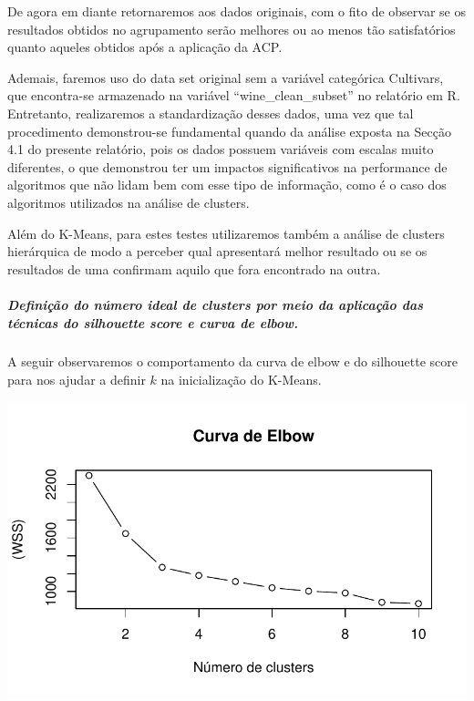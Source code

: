 \documentclass[
  letterpaper,
  DIV=11,
  numbers=noendperiod]{scrartcl}
\let\oldsubparagraph\subparagraph
\renewcommand{\subparagraph}[1]{\oldsubparagraph{#1}\mbox{}}
\begin{document}
De agora em diante retornaremos aos dados originais, com o fito de
observar se os resultados obtidos no agrupamento serão melhores ou ao
menos tão satisfatórios quanto aqueles obtidos após a aplicação da ACP.

Ademais, faremos uso do data set original sem a variável categórica
Cultivars, que encontra-se armazenado na variável
``wine\_clean\_subset'' no relatório em R. Entretanto, realizaremos a
standardização desses dados, uma vez que tal procedimento demonstrou-se
fundamental quando da análise exposta na Secção 4.1 do presente
relatório, pois os dados possuem variáveis com escalas muito diferentes,
o que demonstrou ter um impactos significativos na performance de
algoritmos que não lidam bem com esse tipo de informação, como é o caso
dos algoritmos utilizados na análise de clusters.

Além do K-Means, para estes testes utilizaremos também a análise de
clusters hierárquica de modo a perceber qual apresentará melhor
resultado ou se os resultados de uma confirmam aquilo que fora
encontrado na outra.

\subparagraph{\texorpdfstring{\textbf{Definição do número ideal de
clusters por meio da aplicação das técnicas do silhouette score e curva
de
elbow.}}{Definição do número ideal de clusters por meio da aplicação das técnicas do silhouette score e curva de elbow.}}\label{definiuxe7uxe3o-do-nuxfamero-ideal-de-clusters-por-meio-da-aplicauxe7uxe3o-das-tuxe9cnicas-do-silhouette-score-e-curva-de-elbow.-1}

A seguir observaremos o comportamento da curva de elbow e do silhouette
score para nos ajudar a definir \(k\) na inicialização do K-Means.

\includegraphics{wines_analysis_files/figure-pdf/unnamed-chunk-32-1.pdf}
\end{document}
